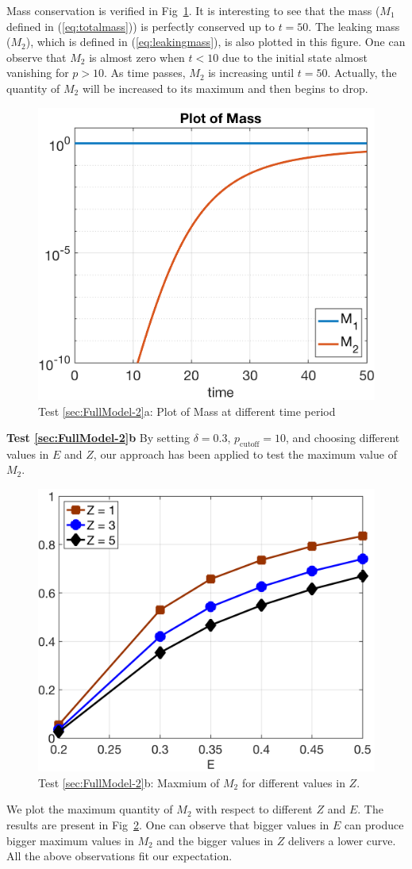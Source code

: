 \documentclass[preprint,11pt]{elsarticle}
\begin{document}
Mass conservation is verified in Fig~\ref{fig:MassPlot}.
It is interesting to see that the mass ($M_1$ defined in (\ref{eq:totalmass})) is perfectly conserved up to $t = 50$. The leaking mass ($M_2$), which is defined in (\ref{eq:leakingmass}), is also plotted in this figure. One can observe that $M_2$ is almost zero when $t<10$ due to the initial state almost vanishing for $p>10$. As time passes, $M_2$ is increasing until $t = 50$. Actually, the quantity of $M_2$ will be increased to its maximum and then begins to drop. 
\begin{figure}[H]
    \centering
    \includegraphics[width=.5\textwidth]{Fig_2D/MassPlot}
    \caption{Test \ref{sec:FullModel-2}a: Plot of Mass at different time period}
    \label{fig:MassPlot}
\end{figure}

{\bf Test \ref{sec:FullModel-2}b} 
By setting $\delta = 0.3$, $p_\text{cutoff} = 10$, and choosing different values in $E$ and $Z$, our approach has been applied to test the maximum value of $M_2$. 
\begin{figure}[H]
    \centering
    \includegraphics[width=.5\textwidth]{./Fig_2D/Rate-Del3e-1}
    \caption{Test \ref{sec:FullModel-2}b: Maxmium of $M_2$ for different values in $Z$.}
    \label{fig:maxM2}
\end{figure}

We plot the maximum quantity of $M_2$ with respect to different $Z$ and $E$. The results are present in Fig~\ref{fig:maxM2}. One can observe that bigger values in $E$ can produce bigger maximum values in $M_2$ and the bigger values in $Z$ delivers a lower curve. All the above observations fit our expectation.
\end{document}
